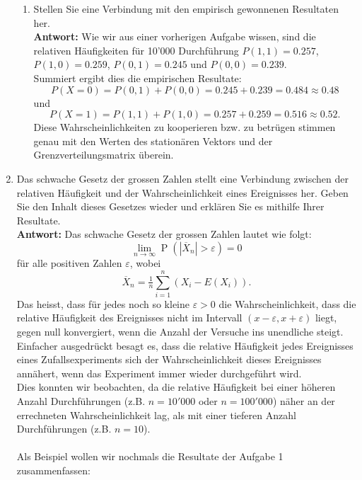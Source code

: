 \documentclass[12pt,a4paper]{article}
\begin{document}
\begin{enumerate}
\begin{enumerate}
\item Stellen Sie eine Verbindung mit den empirisch gewonnenen Resultaten her.\\
\textbf{Antwort:} Wie wir aus einer vorherigen Aufgabe wissen, sind die relativen Häufigkeiten für 10'000 Durchführung $P(1, 1) = 0.257$, $P(1, 0) = 0.259$, $P(0, 1) = 0.245$ und $P(0, 0) = 0.239$.\\
Summiert ergibt dies die empirischen Resultate:
$$P(X = 0) = P(0, 1) + P(0, 0) = 0.245 + 0.239 = 0.484 \approx 0.48$$
und
$$P(X = 1) = P(1, 1) + P(1, 0) = 0.257 + 0.259 = 0.516 \approx 0.52.$$
Diese Wahrscheinlichkeiten zu kooperieren bzw. zu betrügen stimmen genau mit den Werten des stationären Vektors und der Grenzverteilungsmatrix überein.
\end{enumerate}
\newpage

\item Das schwache Gesetz der grossen Zahlen stellt eine Verbindung zwischen der relativen Häufigkeit und der Wahrscheinlichkeit eines Ereignisses her.
Geben Sie den Inhalt dieses Gesetzes wieder und erklären Sie es mithilfe Ihrer Resultate.\\
\textbf{Antwort:} Das schwache Gesetz der grossen Zahlen lautet wie folgt:
$$\lim_{n\rightarrow\infty}\operatorname{P}\left(\left|\overline{X}_n\right|>\varepsilon\right)=0$$
für alle positiven Zahlen $\varepsilon$, wobei
$$\overline{X}_n=\tfrac1n \textstyle\sum\limits_{i=1}^{n}(X_i-E ({X}_i)).$$
Das heisst, dass für jedes noch so kleine $\varepsilon > 0$ die Wahrscheinlichkeit, dass die relative Häufigkeit des Ereignisses nicht im Intervall $(x - \varepsilon, x + \varepsilon)$ liegt, gegen null konvergiert, wenn die Anzahl der Versuche ins unendliche steigt.\\
Einfacher ausgedrückt besagt es, dass die relative Häufigkeit jedes Ereignisses eines Zufallsexperiments sich der Wahrscheinlichkeit dieses Ereignisses annähert, wenn das Experiment immer wieder durchgeführt wird.\\
Dies konnten wir beobachten, da die relative Häufigkeit bei einer höheren Anzahl Durchführungen (z.B. $n=10'000$ oder $n=100'000$) näher an der errechneten Wahrscheinlichkeit lag, als mit einer tieferen Anzahl Durchführungen (z.B. $n=10$).\\
\\
Als Beispiel wollen wir nochmals die Resultate der Aufgabe 1 zusammenfassen:\\
\begin{center}
\begin{tabular}{c|c c c c}

\end{tabular}
\end{center}
\end{enumerate}
\end{document}
